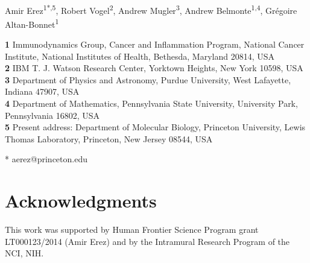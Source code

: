 \documentclass[11pt,a4paper,final]{article}
\begin{document}
\def\be{\begin{equation}}
\def\ee{\end{equation}}
\def\bea{\begin{eqnarray}}
\def\eea{\end{eqnarray}}
\def\nl{\\ \noindent}
\def\nn{\\ \nonumber}
\def\etal{\emph{et al.} }
\newcommand{\gauss}[3]{e^{-\frac{(#3 - #2)^2}{2\sigma_{#1}^2}}}


\begin{flushleft}
{\Large
\textbf{} %
}
\newline
\\
Amir Erez\textsuperscript{1*,5},
Robert Vogel\textsuperscript{2},
Andrew Mugler\textsuperscript{3},
Andrew Belmonte\textsuperscript{1,4},
Gr\'egoire Altan-Bonnet\textsuperscript{1}


\bigskip
\textbf{1} Immunodynamics Group, Cancer and Inflammation Program, National Cancer Institute, National Institutes of Health, Bethesda, Maryland 20814, USA
\\
\textbf{2} IBM T. J. Watson Research Center, Yorktown Heights, New York 10598, USA
\\
\textbf{3} Department of Physics and Astronomy, Purdue University, West Lafayette, Indiana 47907, USA
\\
\textbf{4} Department of Mathematics, Pennsylvania State University, University Park, Pennsylvania 16802, USA
\\
\textbf{5} Present address: Department of Molecular Biology, Princeton University, Lewis Thomas Laboratory, Princeton, New Jersey 08544, USA
\bigskip

* aerez@princeton.edu
\end{flushleft}

\section*{Acknowledgments}
This work was supported by Human Frontier Science Program grant LT000123/2014 (Amir Erez) and by the Intramural Research Program of the NCI, NIH.
\end{document}

